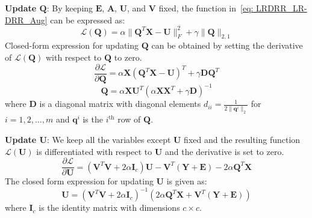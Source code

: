 \noindent\textbf{Update $\mathbf{Q}$}: By keeping $\mathbf{E}$, $\mathbf{A}$, $\mathbf{U}$, and $\mathbf{V}$ fixed, the function in~\eqref{eq: LRDRR_LR-DRR_Aug} can be expressed as:
%
\begin{equation}
    \label{eq: LRDRR_Lag_for_Q}
    \mathcal{L}(\mathbf{Q}) = \alpha \|\mathbf{Q}^{T}\mathbf{X} - \mathbf{U} \|_{F}^{2} + \gamma \| \mathbf{Q} \|_{2,1}
\end{equation}
%
Closed-form expression for updating $\mathbf{Q}$ can be obtained by setting the derivative of $\mathcal{L}(\mathbf{Q})$ with respect to $\mathbf{Q}$ to zero.
%
\begin{equation*}
     \label{eq: LRDRR_Derive_Lag_Q}
    \frac{\partial \mathcal{L}}{\partial \mathbf{Q}} =  \alpha \mathbf{X} (\mathbf{Q}^{T} \mathbf{X} - \mathbf{U})^{T} +  \gamma \mathbf{D} \mathbf{Q}^{T} %
\end{equation*}
%
\begin{equation}
    \label{eq: LRDRR_Define_Q}
    \mathbf{Q} = \alpha \mathbf{X} \mathbf{U}^{T} (\alpha \mathbf{X} \mathbf{X}^{T} + \gamma \mathbf{D})^{-1}
\end{equation}
%
where $\mathbf{D}$ is a diagonal matrix with diagonal elements $d_{ii}=\frac{1}{2\| \mathbf{q}^{i}\|_{2}}$ for $i= 1,2,\dots, m$ and $\mathbf{q}^{i}$ is the $i^{\text{th}}$ row of $\mathbf{Q}$.

\noindent\textbf{Update $\mathbf{U}$}: We keep all the variables except $\mathbf{U}$ fixed and the resulting function $\mathcal{L}(\mathbf{U})$ is differentiated with respect to $\mathbf{U}$ and the derivative is set to zero.
\begin{equation*}
   \label{eq: LRDRR_Derive_Lag_U}
    \frac{\partial \mathcal{L}}{\partial \mathbf{U}} = (\mathbf{V}^{T}\mathbf{V} + 2\alpha\mathbf{I}_{c})\mathbf{U} - \mathbf{V}^{T}(\mathbf{Y} + \mathbf{E}) - 2 \alpha\mathbf{Q}^{T}\mathbf{X} 
\end{equation*}
%
The closed form expression for updating $\mathbf{U}$ is given as:
\begin{equation}
    \label{eq: LRDRR_Define_U}
 \mathbf{U}  = (\mathbf{V}^{T} \mathbf{V} + 2 \alpha \mathbf{I}_{c})^{-1} (2 \alpha \mathbf{Q}^{T} \mathbf{X} + \mathbf{V}^{T} (\mathbf{Y} + \mathbf{E}))
\end{equation}
%
where $\mathbf{I}_{c}$ is the identity matrix with dimensions $c \times c$.

